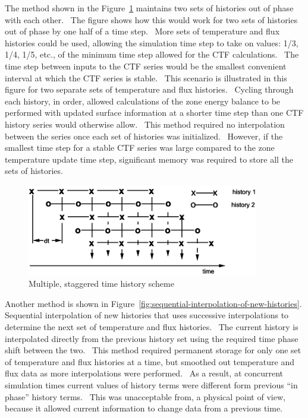 The method shown in the Figure~\ref{fig:multiple-staggered-time-history-scheme} maintains two sets of histories out of phase with each other.~ The figure shows how this would work for two sets of histories out of phase by one half of a time step.~ More sets of temperature and flux histories could be used, allowing the simulation time step to take on values: 1/3, 1/4, 1/5, etc., of the minimum time step allowed for the CTF calculations.~ The time step between inputs to the CTF series would be the smallest convenient interval at which the CTF series is stable.~ This scenario is illustrated in this figure for two separate sets of temperature and flux histories.~ Cycling through each history, in order, allowed calculations of the zone energy balance to be performed with updated surface information at a shorter time step than one CTF history series would otherwise allow.~ This method required no interpolation between the series once each set of histories was initialized.~ However, if the smallest time step for a stable CTF series was large compared to the zone temperature update time step, significant memory was required to store all the sets of histories.

\begin{figure}[hbtp] %
\centering
\includegraphics[width=0.9\textwidth, height=0.9\textheight, keepaspectratio=true]{media/image169.svg.png}
\caption{Multiple, staggered time history scheme \protect \label{fig:multiple-staggered-time-history-scheme}}
\end{figure}

Another method is shown in Figure~\ref{fig:sequential-interpolation-of-new-histories}. Sequential interpolation of new histories that uses successive interpolations to determine the next set of temperature and flux histories.~ The current history is interpolated directly from the previous history set using the required time phase shift between the two.~ This method required permanent storage for only one set of temperature and flux histories at a time, but smoothed out temperature and flux data as more interpolations were performed.~ As a result, at concurrent simulation times current values of history terms were different form previous ``in phase'' history terms.~ This was unacceptable from, a physical point of view, because it allowed current information to change data from a previous time.

